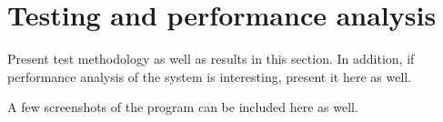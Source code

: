 \chapter{Testing and performance analysis}

Present test methodology as well as results in this section.
In addition, if performance analysis of the system is interesting, present it here as well.

A few screenshots of the program can be included here as well.


